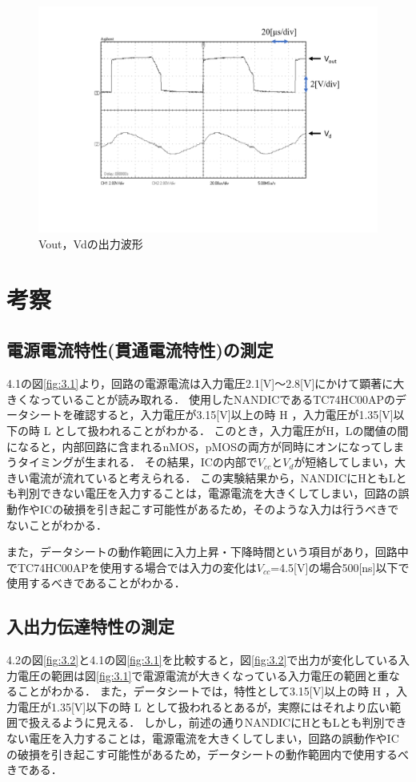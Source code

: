 \documentclass[10pt, a4j, dvipdfmx]{jarticle}
\makeatletter
\newcommand{\figcaption}[1]{\def\@captype{figure}\caption{#1}}
\makeatother
\begin{document}
\begin{figure}[H]
	\centering
	\includegraphics[width=\hsize]{images/223kc-Vout-Vd.png}
	\figcaption{Vout，Vdの出力波形}
	\label{223kc-Vout-Vd}
\end{figure}

\newpage
\section{考察}
\subsection{電源電流特性(貫通電流特性)の測定}
4.1の図\ref{fig:3.1}より，回路の電源電流は入力電圧2.1[V]～2.8[V]にかけて顕著に大きくなっていることが読み取れる．
使用したNANDICであるTC74HC00APのデータシートを確認すると，入力電圧が3.15[V]以上の時 H ，入力電圧が1.35[V]以下の時 L  として扱われることがわかる．
このとき，入力電圧がH，Lの閾値の間になると，内部回路に含まれるnMOS，pMOSの両方が同時にオンになってしまうタイミングが生まれる．
その結果，ICの内部で$V_{cc}$と$V_d$が短絡してしまい，大きい電流が流れていると考えられる．
この実験結果から，NANDICにHともLとも判別できない電圧を入力することは，電源電流を大きくしてしまい，回路の誤動作やICの破損を引き起こす可能性があるため，そのような入力は行うべきでないことがわかる．

また，データシートの動作範囲に入力上昇・下降時間という項目があり，回路中でTC74HC00APを使用する場合では入力の変化は$V_{cc}$=4.5[V]の場合500[ns]以下で使用するべきであることがわかる．

\subsection{入出力伝達特性の測定}
4.2の図\ref{fig:3.2}と4.1の図\ref{fig:3.1}を比較すると，図\ref{fig:3.2}で出力が変化している入力電圧の範囲は図\ref{fig:3.1}で電源電流が大きくなっている入力電圧の範囲と重なることがわかる．
また，データシートでは，特性として3.15[V]以上の時 H ，入力電圧が1.35[V]以下の時 L  として扱われるとあるが，実際にはそれより広い範囲で扱えるように見える．
しかし，前述の通りNANDICにHともLとも判別できない電圧を入力することは，電源電流を大きくしてしまい，回路の誤動作やICの破損を引き起こす可能性があるため，データシートの動作範囲内で使用するべきである．
\end{document}
